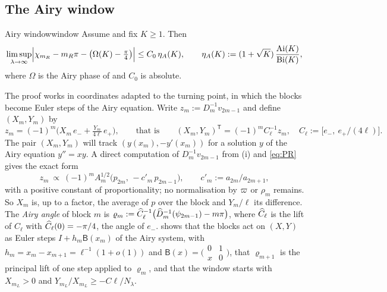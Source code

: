 \subsection{The Airy window}

\begin{boxedlemma}{Airy window}{window}
Assume  and fix $K\ge1$. Then
\[
  \limsup_{\lambda\to\infty}\Bigl|\chi_{m_R}-m_R\pi-\bigl(\Omega(K)-\tfrac\pi4\bigr)\Bigr|
  \le C_0\,\eta_A(K),\qquad \eta_A(K):=(1+\sqrt K)\,\frac{\operatorname{Ai}(K)}{\operatorname{Bi}(K)},
\]
where $\Omega$ is the Airy phase of  and $C_0$ is absolute.
\end{boxedlemma}

The proof works in coordinates adapted to the turning point, in which the blocks become
Euler steps of the Airy equation. Write $z_m:=D_m^{-1}v_{2m-1}$ and define $(X_m,Y_m)$ by
\begin{equation}\label{eq:XY}
  z_m=(-1)^m\bigl(X_m\,e_-+\tfrac{Y_m}{4\ell}\,e_+\bigr),\qquad\text{that is}\qquad
  (X_m,Y_m)^{\mathsf T}=(-1)^mC_\ell^{-1}z_m,\quad C_\ell:=\bigl[e_-,\ e_+/(4\ell)\bigr].
\end{equation}
The pair $(X_m,Y_m)$ will track $(y(x_m),-y'(x_m))$ for a solution $y$ of the Airy
equation $y''=xy$. A direct computation of $D_m^{-1}v_{2m-1}$ from (i)
and \eqref{eq:PR} gives the exact form
\begin{equation}\label{eq:zm}
  z_m\ \propto\ (-1)^mA_m^{1/2}\bigl(p_{2m},\,-c'_m\,p_{2m-1}\bigr),\qquad
  c'_m:=a_{2m}/a_{2m+1},
\end{equation}
with a positive constant of proportionality; no normalisation by $\varpi$ or $\rho_m$
remains. So $X_m$ is, up to a factor, the average of $p$ over the block and $Y_m/\ell$ its
difference. The \emph{Airy angle} of block $m$ is
$\varrho_m:=\widehat C_\ell^{-1}\bigl(\widehat D_m^{-1}(\psi_{2m-1})-m\pi\bigr)$, where $\widehat C_\ell$ is the
lift of $C_\ell$ with $\widehat C_\ell(0)=-\pi/4$, the angle of $e_-$. 
shows that the blocks act on $(X,Y)$ as Euler steps $I+h_m\mathsf B(x_m)$ of the Airy system, with
$h_m=x_m-x_{m+1}=\ell^{-1}(1+o(1))$ and $\mathsf B(x)=\bigl(\begin{smallmatrix}0&1\\x&0\end{smallmatrix}\bigr)$,
that $\varrho_{m+1}$ is the principal lift of one step applied to $\varrho_m$, and that
the window starts with $X_{m_L}>0$ and $Y_{m_L}/X_{m_L}\ge-C\ell/N_\lambda$.

